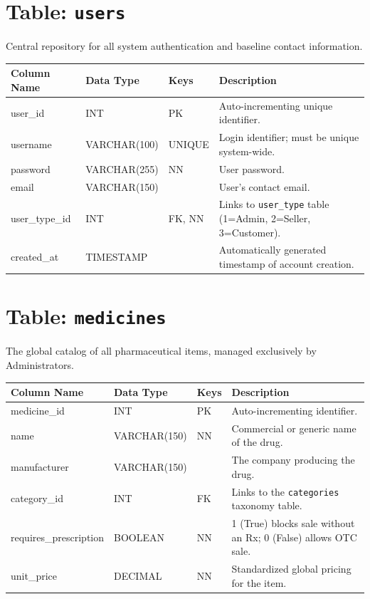 \documentclass[12pt,a4paper]{report}
\begin{document}
\section{Table: \texttt{users}}
Central repository for all system authentication and baseline contact information.
\begin{longtable}{>{\ttfamily}p{3cm} p{3cm} p{2cm} p{6cm}}
\toprule
\rowcolor{headerBlue}\color{white}\textbf{Column Name} & \color{white}\textbf{Data Type} & \color{white}\textbf{Keys} & \color{white}\textbf{Description} \\
\midrule
\endfirsthead
user\_id & INT & PK & Auto-incrementing unique identifier. \\
\rowcolor{rowOdd}username & VARCHAR(100)& UNIQUE & Login identifier; must be unique system-wide. \\
password & VARCHAR(255)& NN & User password. \\
\rowcolor{rowOdd}email & VARCHAR(150)& & User's contact email. \\
user\_type\_id & INT & FK, NN & Links to \texttt{user\_type} table (1=Admin, 2=Seller, 3=Customer). \\
\rowcolor{rowOdd}created\_at & TIMESTAMP & & Automatically generated timestamp of account creation. \\
\bottomrule
\end{longtable}

\section{Table: \texttt{medicines}}
The global catalog of all pharmaceutical items, managed exclusively by Administrators.
\begin{longtable}{>{\ttfamily}p{4.5cm} p{2.8cm} p{2cm} p{5cm}}
\toprule
\rowcolor{headerBlue}\color{white}\textbf{Column Name} & \color{white}\textbf{Data Type} & \color{white}\textbf{Keys} & \color{white}\textbf{Description} \\
\midrule
\endfirsthead
medicine\_id & INT & PK & Auto-incrementing identifier. \\
\rowcolor{rowOdd}name & VARCHAR(150)& NN & Commercial or generic name of the drug. \\
manufacturer & VARCHAR(150)& & The company producing the drug. \\
\rowcolor{rowOdd}category\_id & INT & FK & Links to the \texttt{categories} taxonomy table. \\
requires\_prescription & BOOLEAN & NN & 1 (True) blocks sale without an Rx; 0 (False) allows OTC sale. \\
\rowcolor{rowOdd}unit\_price & DECIMAL & NN & Standardized global pricing for the item. \\
\bottomrule
\end{longtable}
\end{document}
